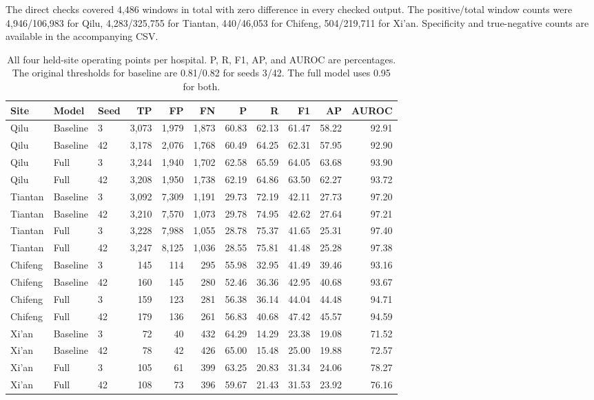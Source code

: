The direct checks covered 4,486 windows in total with zero difference in every checked output. The positive/total window counts were 4,946/106,983 for Qilu, 4,283/325,755 for Tiantan, 440/46,053 for Chifeng, 504/219,711 for Xi'an. Specificity and true-negative counts are available in the accompanying CSV.
\begin{table}[htbp]\centering\small
\caption{All four held-site operating points per hospital. P, R, F1, AP, and AUROC are percentages. The original thresholds for baseline are 0.81/0.82 for seeds 3/42. The full model uses 0.95 for both.}\label{tab:externaldetail}
\begin{tabular}{lllrrrrrrrr}\toprule
Site & Model & Seed & TP & FP & FN & P & R & F1 & AP & AUROC\\\midrule
Qilu & Baseline & 3 & 3,073 & 1,979 & 1,873 & 60.83 & 62.13 & 61.47 & 58.22 & 92.91\\
Qilu & Baseline & 42 & 3,178 & 2,076 & 1,768 & 60.49 & 64.25 & 62.31 & 57.95 & 92.90\\
Qilu & Full & 3 & 3,244 & 1,940 & 1,702 & 62.58 & 65.59 & 64.05 & 63.68 & 93.90\\
Qilu & Full & 42 & 3,208 & 1,950 & 1,738 & 62.19 & 64.86 & 63.50 & 62.27 & 93.72\\
\midrule
Tiantan & Baseline & 3 & 3,092 & 7,309 & 1,191 & 29.73 & 72.19 & 42.11 & 27.73 & 97.20\\
Tiantan & Baseline & 42 & 3,210 & 7,570 & 1,073 & 29.78 & 74.95 & 42.62 & 27.64 & 97.21\\
Tiantan & Full & 3 & 3,228 & 7,988 & 1,055 & 28.78 & 75.37 & 41.65 & 25.31 & 97.40\\
Tiantan & Full & 42 & 3,247 & 8,125 & 1,036 & 28.55 & 75.81 & 41.48 & 25.28 & 97.38\\
\midrule
Chifeng & Baseline & 3 & 145 & 114 & 295 & 55.98 & 32.95 & 41.49 & 39.46 & 93.16\\
Chifeng & Baseline & 42 & 160 & 145 & 280 & 52.46 & 36.36 & 42.95 & 40.68 & 93.67\\
Chifeng & Full & 3 & 159 & 123 & 281 & 56.38 & 36.14 & 44.04 & 44.48 & 94.71\\
Chifeng & Full & 42 & 179 & 136 & 261 & 56.83 & 40.68 & 47.42 & 45.57 & 94.59\\
\midrule
Xi'an & Baseline & 3 & 72 & 40 & 432 & 64.29 & 14.29 & 23.38 & 19.08 & 71.52\\
Xi'an & Baseline & 42 & 78 & 42 & 426 & 65.00 & 15.48 & 25.00 & 19.88 & 72.57\\
Xi'an & Full & 3 & 105 & 61 & 399 & 63.25 & 20.83 & 31.34 & 24.06 & 78.27\\
Xi'an & Full & 42 & 108 & 73 & 396 & 59.67 & 21.43 & 31.53 & 23.92 & 76.16\\
\bottomrule\end{tabular}
\end{table}
